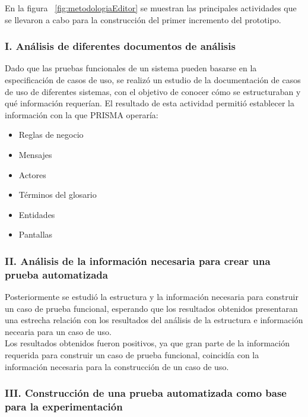 	En la figura ~\ref{fig:metodologiaEditor} se muestran las principales actividades que se llevaron a cabo para la construcción del primer incremento del prototipo.
	
	
\subsubsection{I. Análisis de diferentes documentos de análisis}
	Dado que las pruebas funcionales de un sistema pueden basarse en la especificación de casos de uso, se realizó un estudio de la documentación de casos de uso de diferentes sistemas, con el objetivo de conocer cómo se estructuraban y qué información requerían. El resultado de esta actividad permitió establecer la información con la que PRISMA operaría:
	\begin{itemize}
		\item Reglas de negocio
		\item Mensajes
		\item Actores
		\item Términos del glosario
		\item Entidades
		\item Pantallas
	\end{itemize}
	
\subsubsection{II. Análisis de la información necesaria para crear una prueba automatizada}
		
	Posteriormente se estudió la estructura y la información necesaria para construir un caso de prueba funcional, esperando que los resultados obtenidos presentaran una estrecha relación con los resultados del análisis de la estructura e información necearia para un caso de uso.\\
		
	Los resultados obtenidos fueron positivos, ya que gran parte de la información requerida para construir un caso de prueba funcional, coincidía con la información necesaria para la construcción de un caso de uso.


\subsubsection{III. Construcción de una prueba automatizada como base para la experimentación}

